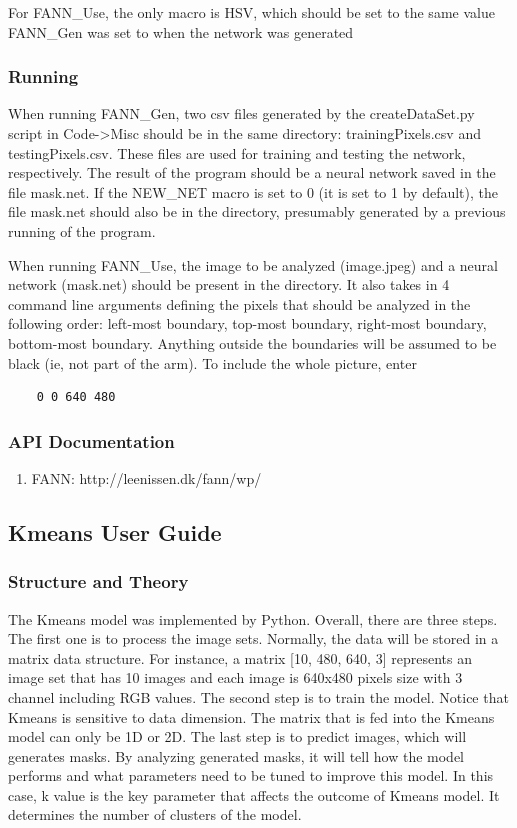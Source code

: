 \documentclass[10pt,journal,compsoc, draftclsnofoot,onecolumn]{IEEEtran}
\begin{document}
For FANN\_Use, the only macro is HSV, which should be set to the same value FANN\_Gen was set to when the network was generated

\subsubsection{Running}
When running FANN\_Gen, two csv files generated by the createDataSet.py script in Code->Misc should be in the same directory: trainingPixels.csv and testingPixels.csv. These files are used for training and testing the network, respectively. The result of the program should be a neural network saved in the file mask.net. If the NEW\_NET macro is set to 0 (it is set to 1 by default), the file mask.net should also be in the directory, presumably generated by a previous running of the program. 

When running FANN\_Use, the image to be analyzed (image.jpeg) and a neural network (mask.net) should be present in the directory. It also takes in 4 command line arguments defining the pixels that should be analyzed in the following order: left-most boundary, top-most boundary, right-most boundary, bottom-most boundary. Anything outside the boundaries will be assumed to be black (ie, not part of the arm). To include the whole picture, enter
\begin{verbatim}
    0 0 640 480
\end{verbatim}

\subsubsection{API Documentation}
\begin{enumerate}
    \item FANN: http://leenissen.dk/fann/wp/
\end{enumerate}

\subsection{Kmeans User Guide}
\subsubsection{Structure and Theory}
The Kmeans model was implemented by Python. Overall, there are three steps. The first one is to process the image sets. Normally, the data will be stored in a matrix data structure. For instance, a matrix [10, 480, 640, 3] represents an image set that has 10 images and each image is 640x480 pixels size with 3 channel including RGB values. The second step is to train the model. Notice that Kmeans is sensitive to data dimension. The matrix that is fed into the Kmeans model can only be 1D or 2D. The last step is to predict images, which will generates masks. By analyzing generated masks, it will tell how the model performs and what parameters need to be tuned to improve this model. In this case, k value is the key parameter that affects the outcome of Kmeans model. It determines the number of clusters of the model. \\
\end{document}
